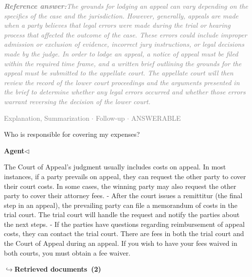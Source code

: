 \documentclass[a4paper,11pt]{article}
\begin{document}
\begin{refanswerenv}
{\footnotesize\textit{\textcolor{gray}{\textbf{Reference answer:}\enspace The grounds for lodging an appeal can vary depending on the specifics of the case and the jurisdiction. However, generally, appeals are made when a party believes that legal errors were made during the trial or hearing process that affected the outcome of the case. These errors could include improper admission or exclusion of evidence, incorrect jury instructions, or legal decisions made by the judge. In order to lodge an appeal, a notice of appeal must be filed within the required time frame, and a written brief outlining the grounds for the appeal must be submitted to the appellate court. The appellate court will then review the record of the lower court proceedings and the arguments presented in the brief to determine whether any legal errors occurred and whether those errors warrant reversing the decision of the lower court.}}}
\end{refanswerenv}
\vspace{0.5em}
\hfill{\tiny\textcolor{gray}{Explanation, Summarization $\cdot$ Follow-up $\cdot$ ANSWERABLE}}
\begin{userbubble}
Who is responsible for covering my expenses?
\end{userbubble}
\noindent\hfill{\small\textcolor{agentcolor}{\textbf{Agent\enspace$\triangleleft$}}}
\begin{agentbubble}
The Court of Appeal's judgment usually includes costs on appeal. In most instances, if a party prevails on appeal, they can request the other party to cover their court costs. In some cases, the winning party may also request the other party to cover their attorney fees. - After the court issues a remittitur (the final step in an appeal), the prevailing party can file a memorandum of costs in the trial court. The trial court will handle the request and notify the parties about the next steps. - If the parties have questions regarding reimbursement of appeal costs, they can contact the trial court. There are fees in both the trial court and the Court of Appeal during an appeal. If you wish to have your fees waived in both courts, you must obtain a fee waiver.
\end{agentbubble}
\noindent\hfill{\footnotesize\textcolor{doccolor}{\textbf{$\hookrightarrow$\enspace Retrieved documents~(2)}}}
\end{document}
